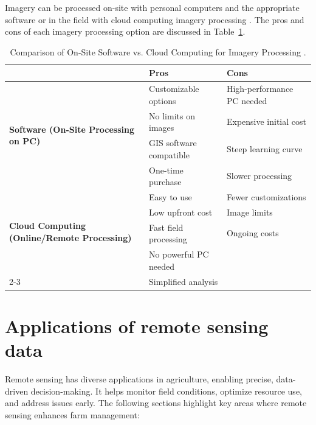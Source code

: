 Imagery can be processed on-site with personal computers and the appropriate software or in the field with cloud computing imagery processing \parencite{olson2021review}. The pros and cons of each imagery processing option are discussed in Table~\ref{tab:ProcessingMethodComparison}.

\begin{table}[h]
    \centering
    \renewcommand{\arraystretch}{1.5} %
    \setlength{\tabcolsep}{8pt} %
    \begin{tabular}{|p{3cm}|p{5.5cm}|p{5.5cm}|}
    \hline
     & \textbf{Pros} & \textbf{Cons} \\ \hline
    
     \multirow{4}{*}{\parbox{2.8cm}{\centering\textbf{Software (On-Site Processing on PC)}}}    & Customizable options & High-performance PC needed \\ \cline{2-3}
    & No limits on images & Expensive initial cost \\ \cline{2-3}
    & GIS software compatible & Steep learning curve \\ \cline{2-3}
    & One-time purchase & Slower processing \\ \hline
    
    \multirow{4}{*}{\parbox{2.8cm}{\centering\textbf{Cloud Computing (Online/Remote Processing)}}}    & Easy to use & Fewer customizations \\ \cline{2-3}
    & Low upfront cost & Image limits \\ \cline{2-3}
    & Fast field processing & Ongoing costs \\ \cline{2-3}
    & No powerful PC needed & \\ \cline{2-3}
    & Simplified analysis & \\ \hline
    \end{tabular}
    \caption{Comparison of On-Site Software vs. Cloud Computing for Imagery Processing \parencite{olson2021review}.}
    \label{tab:ProcessingMethodComparison}
    \end{table}
    

\section{Applications of remote sensing data}
Remote sensing has diverse applications in agriculture, enabling precise, data-driven decision-making. It helps monitor field conditions, optimize resource use, and address issues early. The following sections highlight key areas where remote sensing enhances farm management:

